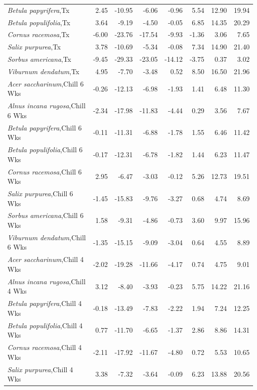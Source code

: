 \documentclass{article}\usepackage[]{graphicx}\usepackage[]{color}
\begin{document}
\begin{longtable}{lrrrrrrr}
  \textit{Betula papyrifera},Tx & 2.45 & -10.95 & -6.06 & -0.96 & 5.54 & 12.90 & 19.94 \\ 
  \textit{Betula populifolia},Tx & 3.64 & -9.19 & -4.50 & -0.05 & 6.85 & 14.35 & 20.29 \\ 
  \textit{Cornus racemosa},Tx & -6.00 & -23.76 & -17.54 & -9.93 & -1.36 & 3.06 & 7.65 \\ 
  \textit{Salix purpurea},Tx & 3.78 & -10.69 & -5.34 & -0.08 & 7.34 & 14.90 & 21.40 \\ 
  \textit{Sorbus americana},Tx & -9.45 & -29.33 & -23.05 & -14.12 & -3.75 & 0.37 & 3.02 \\ 
  \textit{Viburnum dendatum},Tx & 4.95 & -7.70 & -3.48 & 0.52 & 8.50 & 16.50 & 21.96 \\ 
  \textit{Acer saccharinum},Chill 6 Wks & -0.26 & -12.13 & -6.98 & -1.93 & 1.41 & 6.48 & 11.30 \\ 
  \textit{Alnus incana rugosa},Chill 6 Wks & -2.34 & -17.98 & -11.83 & -4.44 & 0.29 & 3.56 & 7.67 \\ 
  \textit{Betula papyrifera},Chill 6 Wks & -0.11 & -11.31 & -6.88 & -1.78 & 1.55 & 6.46 & 11.42 \\ 
  \textit{Betula populifolia},Chill 6 Wks & -0.17 & -12.31 & -6.78 & -1.82 & 1.44 & 6.23 & 11.47 \\ 
  \textit{Cornus racemosa},Chill 6 Wks & 2.95 & -6.47 & -3.03 & -0.12 & 5.26 & 12.73 & 19.51 \\ 
  \textit{Salix purpurea},Chill 6 Wks & -1.45 & -15.83 & -9.76 & -3.27 & 0.68 & 4.74 & 8.69 \\ 
  \textit{Sorbus americana},Chill 6 Wks & 1.58 & -9.31 & -4.86 & -0.73 & 3.60 & 9.97 & 15.96 \\ 
  \textit{Viburnum dendatum},Chill 6 Wks & -1.35 & -15.15 & -9.09 & -3.04 & 0.64 & 4.55 & 8.89 \\ 
  \textit{Acer saccharinum},Chill 4 Wks & -2.02 & -19.28 & -11.66 & -4.17 & 0.74 & 4.75 & 9.01 \\ 
  \textit{Alnus incana rugosa},Chill 4 Wks & 3.12 & -8.40 & -3.93 & -0.23 & 5.75 & 14.22 & 21.16 \\ 
  \textit{Betula papyrifera},Chill 4 Wks & -0.18 & -13.49 & -7.83 & -2.22 & 1.94 & 7.24 & 12.25 \\ 
  \textit{Betula populifolia},Chill 4 Wks & 0.77 & -11.70 & -6.65 & -1.37 & 2.86 & 8.86 & 14.31 \\ 
  \textit{Cornus racemosa},Chill 4 Wks & -2.11 & -17.92 & -11.67 & -4.80 & 0.72 & 5.53 & 10.65 \\ 
  \textit{Salix purpurea},Chill 4 Wks & 3.38 & -7.32 & -3.64 & -0.09 & 6.23 & 13.88 & 20.56 \\ 

\end{longtable}
\end{document}
